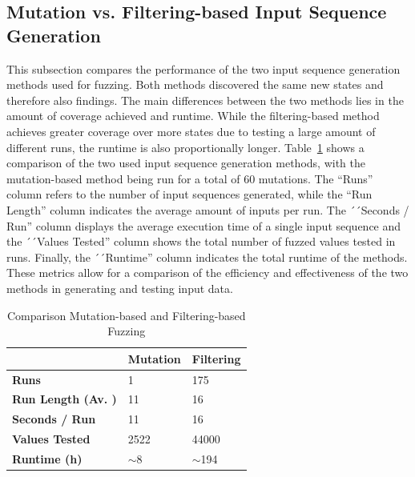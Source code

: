 \subsection{Mutation vs. Filtering-based Input Sequence Generation} \label{subsec:mutation_vs_filtering}
This subsection compares the performance of the two input sequence generation methods used for fuzzing. Both methods discovered the same new states and therefore also findings. The main differences between the two methods lies in the amount of coverage achieved and runtime. While the filtering-based method achieves greater coverage over more states due to testing a large amount of different runs, the runtime is also proportionally longer. Table~\ref{tab:compfuzz} shows a comparison of the two used input sequence generation methods, with the mutation-based method being run for a total of 60 mutations. The ``Runs'' column refers to the number of input sequences generated, while the ``Run Length'' column indicates the average amount of inputs per run. The ´´Seconds / Run'' column displays the average execution time of a single input sequence and the ´´Values Tested'' column shows the total number of fuzzed values tested in runs. Finally, the ´´Runtime'' column indicates the total runtime of the methods. These metrics allow for a comparison of the efficiency and effectiveness of the two methods in generating and testing input data.

\begin{table}[]
	\centering
	\begin{tabular}{|l|l|l|}
		\hline
		\rowcolor[HTML]{EFEFEF} 
		& \textbf{Mutation} & \textbf{Filtering} \\ \hline
		\textbf{Runs}              & 1                 & 175                \\ \hline
		\textbf{Run Length (Av. )} & 11                & 16                 \\ \hline
		\textbf{Seconds / Run}     & 11                & 16                 \\ \hline
		\textbf{Values Tested}     & 2522              & 44000              \\ \hline
		\textbf{Runtime (h)}       & $\sim$8           & $\sim$194          \\ \hline
	\end{tabular}
	\caption{Comparison Mutation-based and Filtering-based Fuzzing}
	\label{tab:compfuzz}
\end{table}

